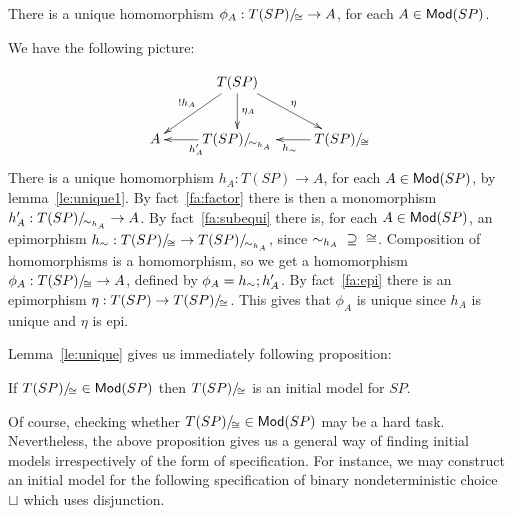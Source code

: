 \documentclass[10pt]{article}
\begin{document}
\begin{lemma}\label{le:unique}
There is a unique homomorphism $\phi_A: T(SP)/\!_{\cong} \to A$, for each $A \in {\sf {Mod}}(SP)$.
\end{lemma}
%
\begin{PROOF}
We have the following picture:

\[
\xymatrix{
		&T(SP) \ar[dl]_{!h_A} \ar[d]^{\eta_A} \ar[dr]^{\eta}\\
	A	& \qu{T(SP)}{\kernel{h_A}} \ar[l]^{h'_A}	
			& \qu{T(SP)}{\cong} \ar[l]^{h_{\quot}}\\
}
\]
There is a unique homomorphism $h_A: T(SP) \to A$, for each $A \in {\sf {Mod}}(SP)$,
by lemma~\ref{le:unique1}. 
By fact~\ref{fa:factor} there is then a monomorphism $h'_A:
{T(SP)/\!_{\sim_{h_A}}} \to A$.
By fact~\ref{fa:subequi} there is, for each $A\in{\sf {Mod}}(SP)$, an epimorphism $h_{\sim}: T(SP)/\!_{\cong} \to
{T(SP)/\!_{\sim_{h_A}}}$, since ${\kernel{h_A}}\ 
\supseteq\ {\cong}$. Composition of homomorphisms is a homomorphism, so we get
a homomorphism $\phi_A: {T(SP)/\!_{\cong}} \to A$, defined by $\phi_A =
h_{\sim};h'_A$. By fact~\ref{fa:epi} there is an epimorphism $\eta:
T(SP) \to T(SP)/\!_{\cong}$. This gives that $\phi_A$ is unique since $h_A$ is
unique and $\eta$ is epi.
\end{PROOF}
%
Lemma~\ref{le:unique} gives us immediately following proposition:
\begin{proposition}\label{prop:if}
If $T(SP)/\!_{\cong} \in {\sf {Mod}}(SP)$ then  $T(SP)/\!_{\cong}$ is an initial model for $SP$.
\end{proposition}
%
Of course, checking whether $T(SP)/\!_{\cong}\in{\sf {Mod}}(SP)$ may be a hard
task. Nevertheless, 
the above proposition gives us a general way of finding initial models
irrespectively of the form of specification. For instance, we may construct
an initial model for the following specification of binary nondeterministic
choice $\sqcup$ which uses disjunction.
\end{document}
